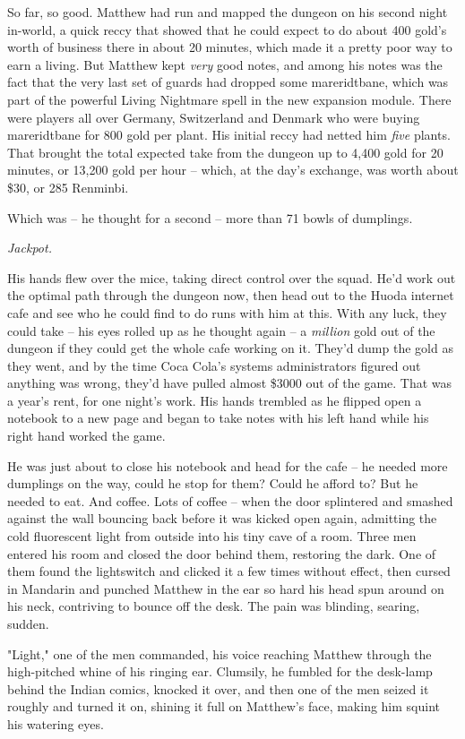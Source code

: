 So far, so good. Matthew had run and mapped the dungeon on his
second night in-world, a quick reccy that showed that he could
expect to do about 400 gold's worth of business there in about 20
minutes, which made it a pretty poor way to earn a living. But
Matthew kept \emph{very} good notes, and among his notes was the
fact that the very last set of guards had dropped some
mareridtbane, which was part of the powerful Living Nightmare spell
in the new expansion module. There were players all over Germany,
Switzerland and Denmark who were buying mareridtbane for 800 gold
per plant. His initial reccy had netted him \emph{five} plants.
That brought the total expected take from the dungeon up to 4,400
gold for 20 minutes, or 13,200 gold per hour -- which, at the day's
exchange, was worth about \$30, or 285 Renminbi.

Which was -- he thought for a second -- more than 71 bowls of
dumplings.

\emph{Jackpot.}

His hands flew over the mice, taking direct control over the squad.
He'd work out the optimal path through the dungeon now, then head
out to the Huoda internet cafe and see who he could find to do runs
with him at this. With any luck, they could take -- his eyes rolled
up as he thought again -- a \emph{million} gold out of the dungeon
if they could get the whole cafe working on it. They'd dump the
gold as they went, and by the time Coca Cola's systems
administrators figured out anything was wrong, they'd have pulled
almost \$3000 out of the game. That was a year's rent, for one
night's work. His hands trembled as he flipped open a notebook to a
new page and began to take notes with his left hand while his right
hand worked the game.

He was just about to close his notebook and head for the cafe -- he
needed more dumplings on the way, could he stop for them? Could he
afford to? But he needed to eat. And coffee. Lots of coffee -- when
the door splintered and smashed against the wall bouncing back
before it was kicked open again, admitting the cold fluorescent
light from outside into his tiny cave of a room. Three men entered
his room and closed the door behind them, restoring the dark. One
of them found the lightswitch and clicked it a few times without
effect, then cursed in Mandarin and punched Matthew in the ear so
hard his head spun around on his neck, contriving to bounce off the
desk. The pain was blinding, searing, sudden.

"Light," one of the men commanded, his voice reaching Matthew
through the high-pitched whine of his ringing ear. Clumsily, he
fumbled for the desk-lamp behind the Indian comics, knocked it
over, and then one of the men seized it roughly and turned it on,
shining it full on Matthew's face, making him squint his watering
eyes.


